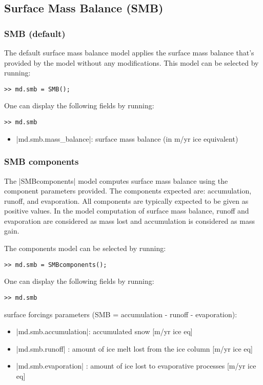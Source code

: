 
\subsection{Surface Mass Balance (SMB)} \label{sec:using-issm-parameterization-smb}

\subsubsection{SMB (default)}
The default surface mass balance model applies the surface mass balance that's provided by the model without any modifications. This model can be selected by running:
\begin{lstlisting}
>> md.smb = SMB();
\end{lstlisting}

One can display the following fields by running:
\begin{lstlisting}
>> md.smb
\end{lstlisting}
\begin{itemize}
	\item \lstinlinebg|md.smb.mass_balance|: surface mass balance (in m/yr ice equivalent)
\end{itemize}

\subsubsection{SMB components}
The \lstinlinebg|SMBcomponents| model computes surface mass balance using the component parameters provided. The components expected are: accumulation, runoff, and evaporation. All components are typically expected to be given as positive values. In the model computation of surface mass balance, runoff and evaporation are considered as mass lost and accumulation is considered as mass gain.

The components model can be selected by running:
\begin{lstlisting}
>> md.smb = SMBcomponents();
\end{lstlisting}

One can display the following fields by running:
\begin{lstlisting}
>> md.smb
\end{lstlisting}
surface forcings parameters (SMB = accumulation - runoff - evaporation):
\begin{itemize}
	\item \lstinlinebg|md.smb.accumulation|: accumulated snow [m/yr ice eq]
	\item \lstinlinebg|md.smb.runoff|      : amount of ice melt lost from the ice column [m/yr ice eq]
	\item \lstinlinebg|md.smb.evaporation| : amount of ice lost to evaporative processes [m/yr ice eq]
\end{itemize}

